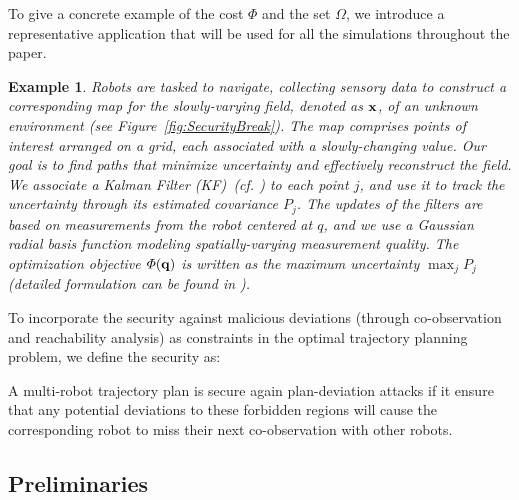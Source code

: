 \documentclass[10pt,twocolumn,twoside]{IEEEtran}
\newtheorem{example}{Example}
\begin{document}
To give a concrete example of the cost $\varPhi$ and the set $\Omega$, we introduce a representative application that will be used for all the simulations throughout the paper.

\begin{example} 
Robots are tasked to navigate, collecting sensory data to construct a corresponding map for the slowly-varying field, denoted as $\mathbf{x}$, of an unknown environment (see Figure~\ref{fig:SecurityBreak}). The map comprises points of interest arranged on a grid, each associated with a slowly-changing value. Our goal is to find paths that minimize uncertainty and effectively reconstruct the field. 
We associate a Kalman Filter (KF)~(cf. \cite{anderson2012optimal}) to each point $j$, and use it to track the uncertainty through its estimated covariance $P_j$. The updates of the filters are based on measurements from the robot centered at $q$, and we use a Gaussian radial basis function  modeling spatially-varying measurement quality. The optimization objective $\varPhi(\mathbf{q})$ is written as the maximum uncertainty $\max_j P_{j}$ (detailed formulation can be found in \cite{yang2020multi}). %
\end{example}

To incorporate the security against malicious deviations (through co-observation and reachability analysis) as constraints in the optimal trajectory planning problem, we define the security as:
\begin{definition}\label{def:secured-plan}
  A multi-robot trajectory plan is secure again plan-deviation attacks if it ensure that any potential deviations to these forbidden regions will cause the corresponding robot to miss their next co-observation with other robots. 
\end{definition}


\subsection{Preliminaries}
\end{document}
